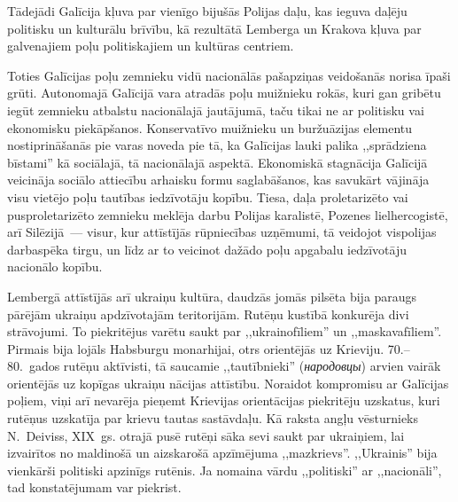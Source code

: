 \documentclass[twoside,a5paper,12pt,fleqn,openany]{extbook}
\newcommand{\rutxti}[1]{\textit{\textrussian{#1}}}
\begin{document}
Tādejādi Galīcija kļuva par vienīgo bijušās Polijas daļu, kas ieguva daļēju politisku un kulturālu brīvību, kā rezultātā Lemberga un Krakova kļuva par galvenajiem poļu politiskajiem un kultūras centriem.

Toties Galīcijas poļu zemnieku vidū nacionālās pašapziņas veidošanās norisa īpaši grūti. Autonomajā Galīcijā vara atradās poļu muižnieku rokās, kuri gan gribētu iegūt zemnieku atbalstu nacionālajā jautājumā, taču tikai ne ar politisku vai ekonomisku piekāpšanos. Konservatīvo muižnieku un buržuāzijas elementu nostiprināšanās pie varas noveda pie tā, ka Galīcijas lauki palika ,,sprādziena bīstami'' kā sociālajā, tā nacionālajā aspektā. Ekonomiskā stagnācija Galīcijā veicināja sociālo attiecību arhaisku formu saglabāšanos, kas savukārt vājināja visu vietējo poļu tautības iedzīvotāju kopību. Tiesa, daļa proletarizēto vai pusproletarizēto zemnieku meklēja darbu Polijas karalistē, Pozenes lielhercogistē, arī Silēzijā~--- visur, kur attīstījās rūpniecības uzņēmumi, tā veidojot vispolijas darbaspēka tirgu, un līdz ar to veicinot dažādo poļu apgabalu iedzīvotāju nacionālo kopību.

Lembergā attīstījās arī ukraiņu kultūra, daudzās jomās pilsēta bija paraugs pārējām ukraiņu apdzīvotajām teritorijām. Rutēņu kustībā konkurēja divi strāvojumi. To piekritējus varētu saukt par ,,ukrainofīliem'' un ,,maskavafīliem''. Pirmais bija lojāls Habsburgu monarhijai, otrs orientējās uz Krieviju. 70.--80.~gados rutēņu aktīvisti, tā saucamie ,,tautībnieki'' (\rutxti{народовцы}) arvien vairāk orientējās uz kopīgas ukraiņu nācijas attīstību. Noraidot kompromisu ar Galīcijas poļiem, viņi arī nevarēja pieņemt Krievijas orientācijas piekritēju uzskatus, kuri rutēņus uzskatīja par krievu tautas sastāvdaļu. Kā raksta angļu vēsturnieks N.~Deiviss, XIX~gs. otrajā pusē rutēņi sāka sevi saukt par ukraiņiem, lai izvairītos no maldinošā un aizskarošā apzīmējuma ,,mazkrievs''. ,,Ukrainis'' bija vienkārši politiski apzinīgs rutēnis. Ja nomaina vārdu ,,politiski'' ar ,,nacionāli'', tad konstatējumam var piekrist.
\end{document}
